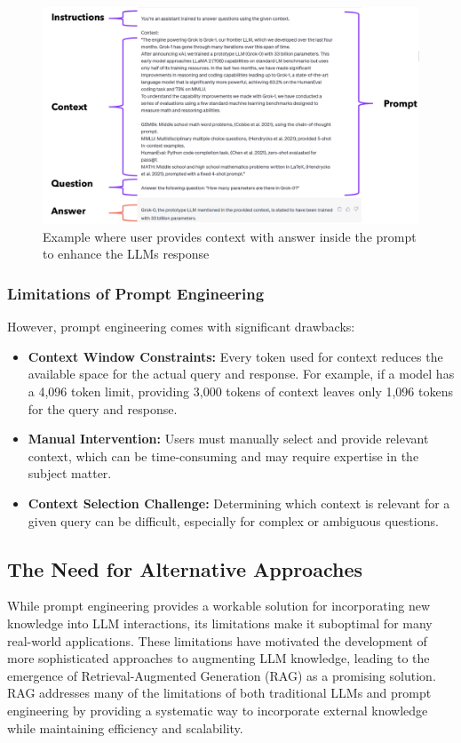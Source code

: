 \documentclass[12pt]{article}
\begin{document}
    \begin{figure}[h!]
        \centering
        \includegraphics[width=1.0\textwidth]{prompt_engineering.png}
        \caption{Example where user provides context with answer inside the prompt to enhance the LLMs response \cite{prompt_engineering}}
        \label{fig:visual_cortex}
    \end{figure}

    \subsubsection{Limitations of Prompt Engineering}
    
    However, prompt engineering comes with significant drawbacks:
    \begin{itemize}
    \item \textbf{Context Window Constraints:} Every token used for context reduces the 
    available space for the actual query and response. For example, if a model has a 4,096 
    token limit, providing 3,000 tokens of context leaves only 1,096 tokens for the query and response.
    
    \item \textbf{Manual Intervention:} Users must manually select and provide relevant context, 
    which can be time-consuming and may require expertise in the subject matter.
        
    \item \textbf{Context Selection Challenge:} Determining which context is relevant for a 
    given query can be difficult, especially for complex or ambiguous questions.    
    \end{itemize}

    \newpage
    \subsection{The Need for Alternative Approaches}
    While prompt engineering provides a workable solution for incorporating new knowledge 
    into LLM interactions, its limitations make it suboptimal for many real-world applications.
    These limitations have motivated the development of more sophisticated approaches to 
    augmenting LLM knowledge, leading to the emergence of Retrieval-Augmented Generation (RAG) 
    as a promising solution. RAG addresses many of the limitations of both traditional LLMs 
    and prompt engineering by providing a systematic way to incorporate external knowledge while 
    maintaining efficiency and scalability.

\end{document}
